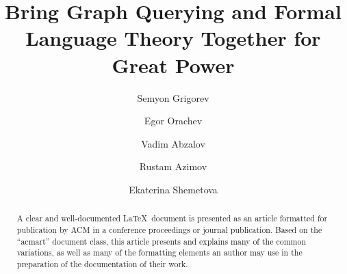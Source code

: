 \documentclass[sigconf]{acmart}
\begin{document}
\title{Bring Graph Querying and Formal Language Theory Together for Great Power}

\author{Semyon Grigorev}

\author{Egor Orachev}

\author{Vadim Abzalov}

\author{Rustam Azimov}

\author{Ekaterina Shemetova}

\renewcommand{\shortauthors}{Trovato and Tobin, et al.}

\begin{abstract}
  A clear and well-documented \LaTeX\ document is presented as an
  article formatted for publication by ACM in a conference proceedings
  or journal publication. Based on the ``acmart'' document class, this
  article presents and explains many of the common variations, as well
  as many of the formatting elements an author may use in the
  preparation of the documentation of their work.
\end{abstract}
\end{document}
